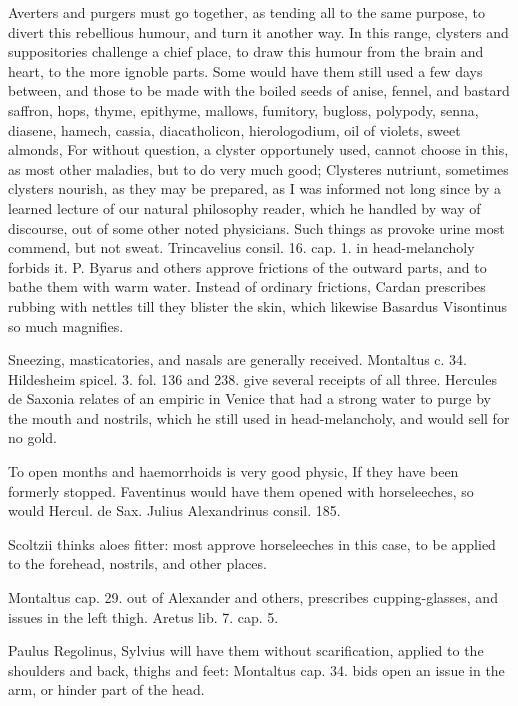 Averters and purgers must go together, as tending all to the same
purpose, to divert this rebellious humour, and turn it another way. In
this range, clysters and suppositories challenge a chief place, to draw
this humour from the brain and heart, to the more ignoble parts. Some
would have them still used a few days between, and those to be made
with the boiled seeds of anise, fennel, and bastard saffron, hops,
thyme, epithyme, mallows, fumitory, bugloss, polypody, senna, diasene,
hamech, cassia, diacatholicon, hierologodium, oil of violets, sweet
almonds, \etc{} For without question, a clyster opportunely used, cannot
choose in this, as most other maladies, but to do very much good;
Clysteres nutriunt, sometimes clysters nourish, as they may be
prepared, as I was informed not long since by a learned lecture of our
natural philosophy reader, which he handled by way of discourse,
out of some other noted physicians. Such things as provoke urine most
commend, but not sweat. Trincavelius consil. 16. cap. 1. in
head-melancholy forbids it. P. Byarus and others approve frictions of
the outward parts, and to bathe them with warm water. Instead of
ordinary frictions, Cardan prescribes rubbing with nettles till they
blister the skin, which likewise Basardus Visontinus so much
magnifies.

Sneezing, masticatories, and nasals are generally received. Montaltus
c. 34. Hildesheim spicel. 3. fol. 136 and 238. give several receipts of
all three. Hercules de Saxonia relates of an empiric in Venice
that had a strong water to purge by the mouth and nostrils, which
he still used in head-melancholy, and would sell for no gold.

To open months and haemorrhoids is very good physic, If they have
been formerly stopped. Faventinus would have them opened with
horseleeches, so would Hercul. de Sax. Julius Alexandrinus consil. 185.

Scoltzii thinks aloes fitter: most approve horseleeches in this
case, to be applied to the forehead, nostrils, and other places.

Montaltus cap. 29. out of Alexander and others, prescribes 
cupping-glasses, and issues in the left thigh. Aretus lib. 7. cap. 5.

Paulus Regolinus, Sylvius will have them without scarification,
applied to the shoulders and back, thighs and feet: Montaltus
cap. 34. bids open an issue in the arm, or hinder part of the head.

